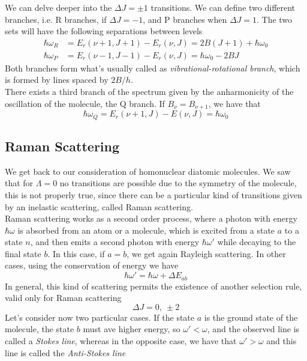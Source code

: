 \documentclass[a4paper, 11pt]{book}
\newcommand{\1}{\opr{\mathds{1}}}
\theoremstyle{plain}
\begin{document}
	We can delve deeper into the $\Delta J=\pm1$ transitions. We can define two different branches, i.e. R branches, if $\Delta J=-1$, and P branches when $\Delta J=1$. The two sets will have the following separations between levels
	\begin{equation}
		\begin{aligned}
			\hbar\omega_{R}&=E_r(\nu+1,J+1)-E_r(\nu,J)=2B(J+1)+\hbar\omega_0\\
			\hbar\omega_{P}&=E_r(\nu-1,J-1)-E_r(\nu,J)=\hbar\omega_0-2BJ
		\end{aligned}
		\label{eq:RPbranches}
	\end{equation}
	Both branches form what's usually called as \textit{vibrational-rotational branch}, which is formed by lines spaced by $2B/h$.\\
	There exists a third branch of the spectrum given by the anharmonicity of the oscillation of the molecule, the Q branch. If $B_\nu=B_{\nu+1}$, we have that
	\begin{equation}
		\hbar\omega_Q=E_r(\nu+1,J)-E(\nu,J)=\hbar\omega_0
		\label{eq:Qbranch}
	\end{equation}
	\subsection{Raman Scattering}
	We get back to our consideration of homonuclear diatomic molecules. We saw that for $\Lambda=0$ no transitions are possible due to the symmetry of the molecule, this is not properly true, since there can be a particular kind of transitions given by an inelastic scattering, called Raman scattering.\\
	Raman scattering works as a second order process, where a photon with energy $\hbar\omega$ is absorbed from an atom or a molecule, which is excited from a state $a$ to a state $n$, and then emits a second photon with energy $\hbar\omega'$ while decaying to the final state $b$. In this case, if $a=b$, we get again Rayleigh scattering. In other cases, using the conservation of energy we have
	\begin{equation}
		\hbar\omega'=\hbar\omega+\Delta E_{ab}
		\label{eq:ramanfrequency}
	\end{equation}
	In general, this kind of scattering permits the existence of another selection rule, valid only for Raman scattering
	\begin{equation}
		\Delta J=0,\ \pm2
		\label{eq:deltaJramans}
	\end{equation}
	Let's consider now two particular cases. If the state $a$ is the ground state of the molecule, the state $b$ must ave higher energy, so $\omega'<\omega$, and the observed line is called a \textit{Stokes line}, whereas in the opposite case, we have that $\omega'>\omega$ and this line is called the \textit{Anti-Stokes line}\\
\end{document}
